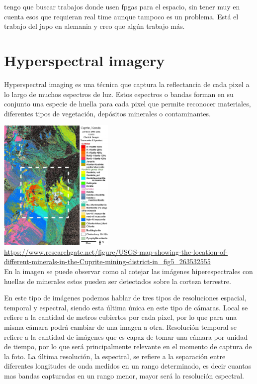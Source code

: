 tengo que buscar trabajos donde usen fpgas para el espacio, sin tener muy en cuenta esos que requieran real time aunque tampoco es un problema. Está el trabajo del japo en alemania y creo que algún trabajo más.

\section{Hyperspectral imagery}
Hyperspectral imaging es una técnica que captura la reflectancia de cada pixel a lo largo de muchos espectros de luz.
Estos espectros o bandas forman en su conjunto una especie de huella para cada pixel que permite reconocer materiales, diferentes tipos de vegetación, depósitos minerales o contaminantes.

\includegraphics[height=2.5in]{figures/cuprite.png}
\\
\url{https://www.researchgate.net/figure/USGS-map-showing-the-location-of-different-minerals-in-the-Cuprite-mining-district-in_fig5_263532555}
\\
En la imagen se puede observar como al cotejar las imágenes hiperespectrales con huellas de minerales estos pueden ser detectados sobre la corteza terrestre.

\bigskip
En este tipo de imágenes podemos hablar de tres tipos de resoluciones espacial, temporal y espectral, siendo esta última única en este tipo de cámaras. Local se refiere a la cantidad de metros cubiertos por cada pixel, por lo que para una misma cámara podrá cambiar de una imagen a otra. Resolución temporal se refiere a la cantidad de imágenes que es capaz de tomar una cámara por unidad de tiempo, por lo que será principalmente relevante en el momento de captura de la foto. La última resolución, la espectral, se refiere a la separación entre diferentes longitudes de onda medidos en un rango determinado, es decir cuantas mas bandas capturadas en un rango menor, mayor será la resolución espectral.

